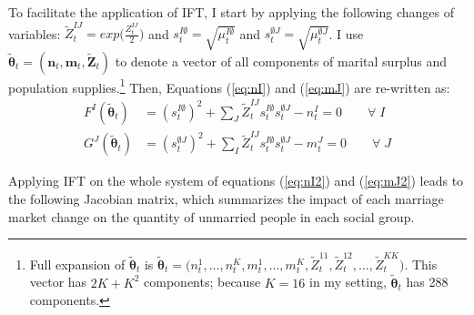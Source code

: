 To facilitate the application of IFT, I start by applying the following changes of variables: $\tilde{Z}^{IJ}_t = exp \Big( \frac{Z^{IJ}_t}{2} \Big)$ and $s^{I\emptyset}_t = \sqrt{\mu^{I\emptyset}_t}$ and $s^{\emptyset J}_t = \sqrt{\mu^{\emptyset J}_t}$. I use $\tilde{\boldsymbol{\theta}}_t = (\mathbf{n}_t, \mathbf{m}_t, \mathbf{\tilde{Z}}_t)$ to denote a vector of all components of marital surplus and population supplies.\footnote{Full expansion of $\tilde{\boldsymbol{\theta}}_t $ is $\tilde{\boldsymbol{\theta}}_t = \Big( n^1_t, \ldots, n^K_t, m^1_t, \ldots, m^K_t, \tilde{Z}^{11}_t, \tilde{Z}^{12}_t, \ldots, \tilde{Z}^{KK}_t \Big)$. This vector has $2K + K^2$ components; because $K=16$ in my setting, $\tilde{\boldsymbol{\theta}}_t$ has 288 components.} Then, Equations (\ref{eq:nI}) and (\ref{eq:mJ}) are re-written as:
\begin{align}
	F^I(\tilde{\boldsymbol{\theta}}_t) &= (s^{I\emptyset}_t)^2 + \sum_J \tilde{Z}^{IJ}_t s^{I\emptyset}_t s^{\emptyset J}_t - n^I_t = 0 \quad \quad \forall \; I \label{eq:nI2} \\ 
	G^J(\tilde{\boldsymbol{\theta}}_t) &= (s^{\emptyset J}_t)^2 + \sum_I \tilde{Z}^{IJ}_t s^{I\emptyset}_t s^{\emptyset J}_t - m^J_t = 0 \quad \quad \forall \; J \label{eq:mJ2}
\end{align}


Applying IFT on the whole system of equations (\ref{eq:nI2}) and (\ref{eq:mJ2}) leads to the following Jacobian matrix, which summarizes the impact of each marriage market change on the quantity of unmarried people in each social group. 


